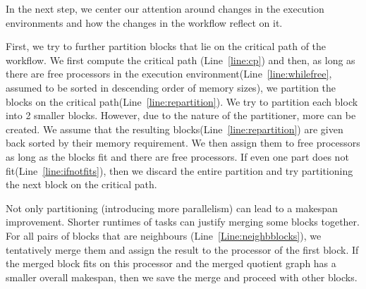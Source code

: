 \documentclass[sigconf,review,anonymous]{acmart}
\begin{document}
    In the next step, we center our attention around changes in the execution environments and how the changes in
    the workflow reflect on it.

    First, we try to further partition blocks that lie on the critical path of the workflow.
    We first compute the critical path (Line~\ref{line:cp}) and then, as long as there are free processors in the
    execution environment(Line~\ref{line:whilefree}, assumed to be sorted in descending order of memory sizes),
    we partition the blocks on the critical path(Line~\ref{line:repartition}).
    We try to partition each block into 2 smaller blocks.
    However, due to the nature of the partitioner, more can be created.
    We assume that the resulting blocks(Line~\ref{line:repartition}) are given back sorted by their memory requirement.
    We then assign them to free processors as long as the blocks fit and there are free processors.
    If even one part does not fit(Line~\ref{line:ifnotfits}), then we discard the entire partition and try partitioning
    the next block on the critical path.

    Not only partitioning (introducing more parallelism) can lead to a makespan improvement.
    Shorter runtimes of tasks can justify merging some blocks together.
    For all pairs of blocks that are neighbours (Line~\ref{Line:neighbblocks}), we tentatively merge them and assign
    the result to the processor of the first block.
    If the merged block fits on this processor and the merged quotient graph has a smaller overall makespan, then we save
    the merge and proceed with other blocks.
\end{document}
